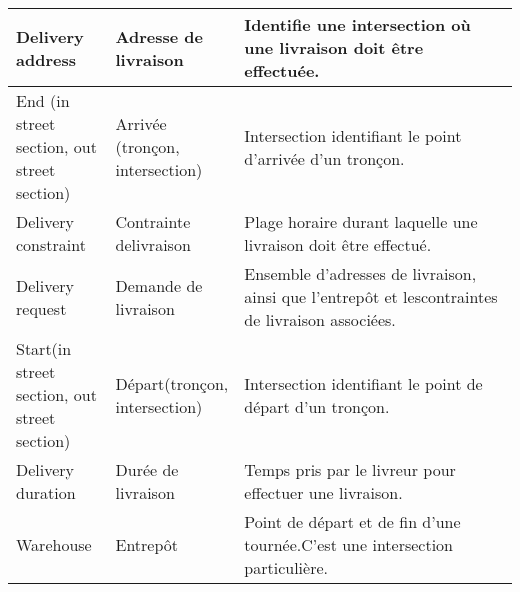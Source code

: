 \begin{table}[]
\begin{longtable}{|p{0.2\linewidth}|p{0.2\linewidth}|p{0.6\linewidth}|}
\hline \hline
\endlastfoot
\hline
Delivery address                            & Adresse de livraison            & Identifie une intersection où une livraison doit être effectuée.                                                                                                                                                                                                                    \\ \hline
End (in street section, out street section)   & Arrivée (tronçon, intersection) & Intersection identifiant le point d'arrivée d'un tronçon.                                                                                                                                                                                                                           \\ \hline
Delivery constraint                         & Contrainte delivraison         & Plage horaire durant laquelle une livraison doit être effectué.                                                                                                                                                                                                                     \\ \hline
Delivery request                            & Demande de livraison            & Ensemble d'adresses de livraison, ainsi que l'entrepôt et lescontraintes de livraison associées.                                                                                                                                                                                    \\ \hline
Start(in street section, out street section) & Départ(tronçon, intersection)  & Intersection identifiant le point de départ d'un tronçon.                                                                                                                                                                                                                           \\ \hline
Delivery duration                           & Durée de livraison             & Temps pris par le livreur pour effectuer une livraison.                                                                                                                                                                                                                             \\ \hline
Warehouse                                   & Entrepôt                       & Point de départ et de fin d'une tournée.C'est une intersection particulière.                                                                                                                                                                                                        \\ \hline

\end{longtable}
\end{table}
